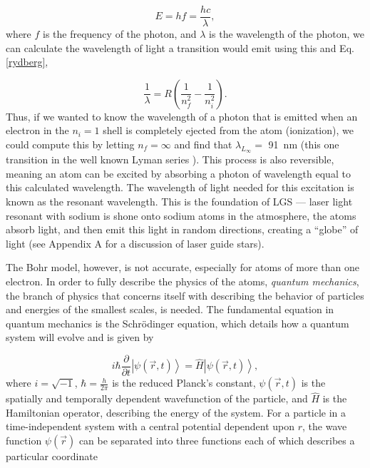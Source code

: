 \begin{equation}
  E = h f = \frac{hc}{\lambda},
  \label{energyfrequency}
\end{equation}
%
where $f$ is the frequency of the photon, and $\lambda$ is the wavelength of the photon, we can calculate the wavelength of light a transition would emit using this and Eq. \ref{rydberg},


\begin{equation}
		\frac{1}{\lambda} = R\left( \frac{1}{n_f^2} - \frac{1}{n_i^2}\right).
  \label{rydbergw}
\end{equation}
%
Thus, if we wanted to know the wavelength of a photon that is emitted when an electron in the $n_i=1$ shell is completely ejected from the atom (ionization), we could compute this by letting $n_f = \infty$ and find that $\lambda_{L_{\infty}} = $ \SI{91}{\nano \meter} (this one transition in the well known Lyman series \cite{Townsend}). This process is also reversible, meaning an atom can be excited by absorbing a photon of wavelength equal to this calculated wavelength. The wavelength of light needed for this excitation is known as the resonant wavelength. This is the foundation of LGS --- laser light resonant with sodium is shone onto sodium atoms in the atmosphere, the atoms absorb light, and then emit this light in random directions, creating a ``globe'' of light (see Appendix A for a discussion of laser guide stars).


The Bohr model, however, is not accurate, especially for atoms of more than one electron. In order to fully describe the physics of the atoms, \textit{quantum mechanics}, the branch of physics that concerns itself with describing the behavior of particles and energies of the smallest scales, is needed. The fundamental equation in quantum mechanics is the Schr\"{o}dinger equation, which details how a quantum system will evolve and is given by

\begin{equation}
	i \hbar \frac{\partial}{\partial t} \left| \psi(\vec r,t) \right> = \hat H \left| \psi (\vec r,t)\right>,
	\label{eq:schrodingers}
\end{equation}
%
where $i = \sqrt{-1}$, $\hbar = \frac{h}{ 2 \pi}$ is the reduced Planck's constant, $\psi (\vec r,t)$ is the spatially and temporally dependent wavefunction of the particle, and $\hat H$ is the Hamiltonian operator, describing the energy of the system. For a particle in a time-independent system with a central potential dependent upon $r$, the wave function $\psi (\vec r)$ can be separated into three functions each of which describes a particular coordinate 


